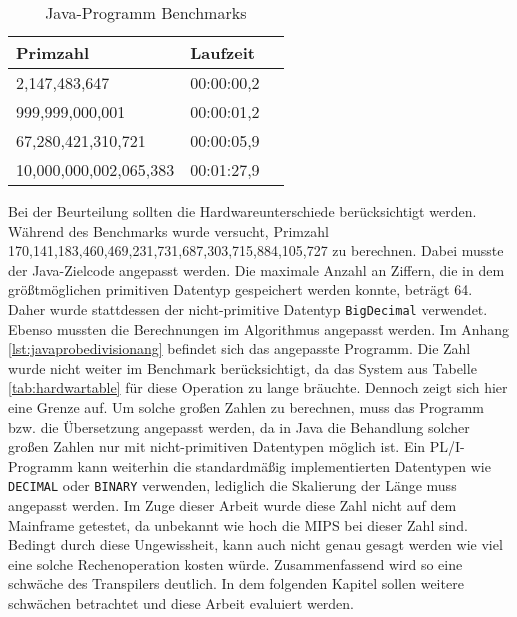 \begin{table}[h]
	\centering
	\begin{tabularx}{\textwidth}{|X|X|X|}
		\hline
		\textbf{Primzahl} & \textbf{Laufzeit}  \\
		\hline
		2,147,483,647 & 00:00:00,2 \\
		
		999,999,000,001 & 00:00:01,2 \\
		
		67,280,421,310,721 & 00:00:05,9 \\
		
		10,000,000,002,065,383 & 00:01:27,9 \\
		\hline
	\end{tabularx}
	\caption{Java-Programm Benchmarks \label{tab:javabenchmark}}
\end{table}

Bei der Beurteilung sollten die Hardwareunterschiede berücksichtigt werden.
Während des Benchmarks wurde versucht, Primzahl 170,141,183,460,469,231,731,687,303,715,884,105,727
zu berechnen. Dabei musste der Java-Zielcode angepasst werden. Die maximale Anzahl an Ziffern, die in dem größtmöglichen
primitiven Datentyp gespeichert werden konnte, beträgt 64. Daher wurde stattdessen der nicht-primitive Datentyp \verb+BigDecimal+ verwendet. 
Ebenso mussten die Berechnungen im Algorithmus angepasst werden. Im Anhang \ref{lst:javaprobedivisionang} befindet sich das angepasste Programm.
Die Zahl wurde nicht weiter im Benchmark berücksichtigt, da das System aus Tabelle \ref{tab:hardwartable} für diese Operation zu lange bräuchte.
Dennoch zeigt sich hier eine Grenze auf. Um solche großen Zahlen zu berechnen, muss das Programm bzw. die Übersetzung angepasst werden,
da in Java die Behandlung solcher großen Zahlen nur mit nicht-primitiven Datentypen möglich ist.
Ein PL/I-Programm kann weiterhin die standardmäßig implementierten Datentypen wie \verb+DECIMAL+ oder \verb+BINARY+ verwenden, lediglich die Skalierung der Länge muss angepasst werden.
Im Zuge dieser Arbeit wurde diese Zahl nicht auf dem Mainframe getestet, da unbekannt wie hoch die \ac{MIPS} bei dieser Zahl sind.
Bedingt durch diese Ungewissheit, kann auch nicht genau gesagt werden wie viel eine solche Rechenoperation kosten würde. 
Zusammenfassend wird so eine schwäche des Transpilers deutlich. In dem folgenden Kapitel sollen weitere schwächen betrachtet und diese Arbeit evaluiert werden.

